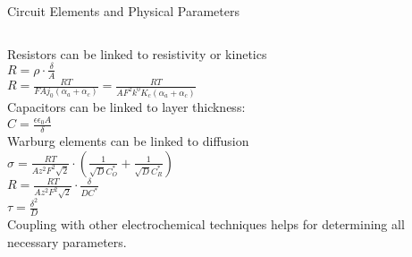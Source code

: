 \documentclass[10pt,compress,handout]{beamer}
\begin{document}
    \begin{frame}{Circuit Elements and Physical Parameters}
        \begin{columns}[t]
                Resistors can be linked to resistivity or kinetics \citep{barsoukov2005}\\
                $R = \rho \cdot \frac{\delta}{A}$ \\
                $R = \frac{RT}{FAj_0(\alpha _a + \alpha _c)} = \frac{RT}{AF^2k^0K_c (\alpha _a + \alpha _c)}$\\[0.25cm]

                Capacitors can be linked to layer thickness: \\
                $C = \frac{\epsilon \epsilon _0 A}{\delta}$\\[0.25cm]

                Warburg elements can be linked to diffusion\\
                $\sigma = \frac{RT}{Az^2F^2\sqrt{2}} \cdot \left( \frac{1}{\sqrt{D}C^*_O} + \frac{1}{\sqrt{D}C^*_R} \right)$\\
                $R = \frac{RT}{Az^2F^2\sqrt{2}} \cdot \frac{\delta}{DC^*}$\\
                $\tau = \frac{\delta ^2}{D}$\\[0.25cm]

                Coupling with other electrochemical techniques helps for determining all 
                necessary parameters.
        \end{columns}
    \end{frame}
    
\end{document}
